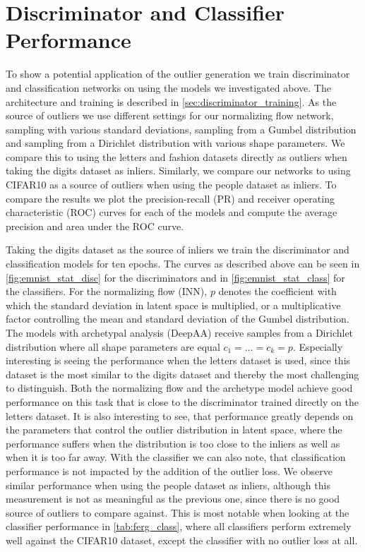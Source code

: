 \section{Discriminator and Classifier Performance}%
\label{sec:discriminator_performance}

To show a potential application of the outlier generation we train
discriminator and classification networks on using the models we investigated
above. The architecture and training is described in
\autoref{sec:discriminator_training}. As the source of outliers we use
different settings for our normalizing flow network, sampling with various
standard deviations, sampling from a Gumbel distribution and sampling from a
Dirichlet distribution with various shape parameters. We compare this to using
the letters and fashion datasets directly as outliers when taking the digits
dataset as inliers. Similarly, we compare our networks to using CIFAR10 as a
source of outliers when using the people dataset as inliers. To compare the
results we plot the precision-recall (PR) and receiver operating characteristic
(ROC) curves for each of the models and compute the average precision and area
under the ROC curve.

Taking the digits dataset as the source of inliers we train the discriminator
and classification models for ten epochs. The curves as described above can be
seen in \autoref{fig:emnist_stat_disc} for the discriminators and in
\autoref{fig:emnist_stat_class} for the classifiers. For the normalizing flow
(INN), $p$ denotes the coefficient with which the standard deviation in latent
space is multiplied, or a multiplicative factor controlling the mean and
standard deviation of the Gumbel distribution. The models with archetypal
analysis (DeepAA) receive samples from a Dirichlet distribution where all shape
parameters are equal $c_1 = \dots = c_k = p$. Especially interesting is seeing
the performance when the letters dataset is used, since this dataset is the
most similar to the digits dataset and thereby the most challenging to
distinguish. Both the normalizing flow and the archetype model achieve good
performance on this task that is close to the discriminator trained directly on
the letters dataset. It is also interesting to see, that performance greatly
depends on the parameters that control the outlier distribution in latent
space, where the performance suffers when the distribution is too close to the
inliers as well as when it is too far away. With the classifier we can also
note, that classification performance is not impacted by the addition of the
outlier loss. We observe similar performance when using the people dataset as
inliers, although this measurement is not as meaningful as the previous one,
since there is no good source of outliers to compare against. This is most
notable when looking at the classifier performance in \autoref{tab:ferg_class},
where all classifiers perform extremely well against the CIFAR10 dataset,
except the classifier with no outlier loss at all.

